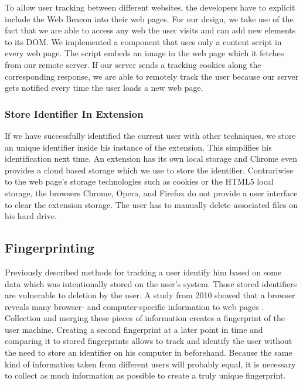 	To allow user tracking between different websites, the developers have to explicit include the Web Beacon into their web pages. For our design, we take use of the fact that we are able to access any web the user visits and can add new elements to its DOM. We implemented a component that uses only a content script in every web page. The script embeds an image in the web page which it fetches from our remote server. If our server sends a tracking cookies along the corresponding response, we are able to remotely track the user because our server gets notified every time the user loads a new web page.  

\subsubsection{Store Identifier In Extension}
\label{sec:storeIdentifier}

	If we have successfully identified the current user with other techniques, we store an unique identifier inside his instance of the extension. This simplifies his identification next time. An extension has its own local storage and Chrome even provides a cloud based storage which we use to store the identifier. Contrariwise to the web page's storage technologies such as cookies or the HTML5 local storage, the browsers Chrome, Opera, and Firefox do not provide a user interface to clear the extension storage. The user has to manually delete associated files on his hard drive. 

\subsection{Fingerprinting}
\label{sec:fingerprinting}

	Previously described methods for tracking a user identify him based on some data which was intentionally stored on the user's system. Those stored identifiers are vulnerable to deletion by the user. A study from 2010 showed that a browser reveals many browser- and computer-specific information to web pages \cite{Eckersley:2010:UYW:1881151.1881152}. Collection and merging these pieces of information creates a fingerprint of the user machine. Creating a second fingerprint at a later point in time and comparing it to stored fingerprints allows to track and identify the user without the need to store an identifier on his computer in beforehand. Because the same kind of information taken from different users will probably equal, it is necessary to collect as much information as possible to create a truly unique fingerprint. 
	
